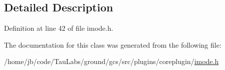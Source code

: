 \subsection{\-Detailed \-Description}


\-Definition at line 42 of file imode.\-h.



\-The documentation for this class was generated from the following file\-:\begin{DoxyCompactItemize}
\item 
/home/jb/code/\-Tau\-Labs/ground/gcs/src/plugins/coreplugin/\hyperlink{imode_8h}{imode.\-h}\end{DoxyCompactItemize}
